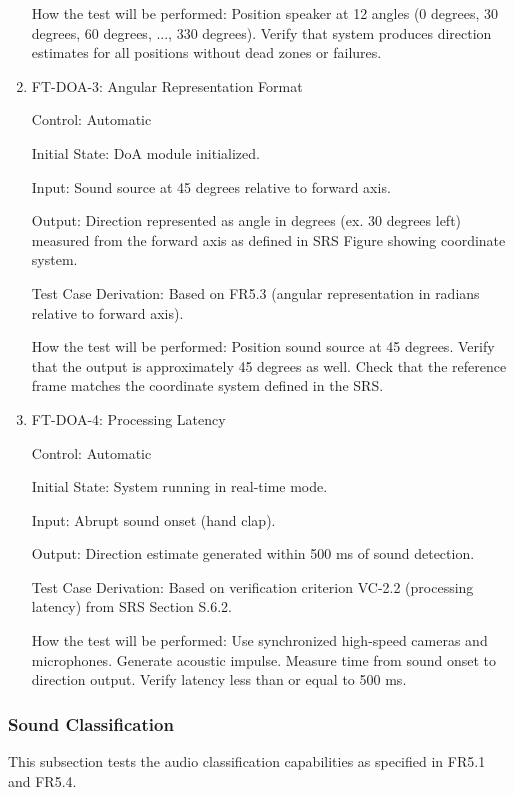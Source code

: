 \documentclass[12pt, titlepage]{article}
\begin{document}
\begin{enumerate}
How the test will be performed: Position speaker at 12 angles (0 degrees, 30 degrees, 60 degrees, ...,
330 degrees). Verify that system produces direction estimates for all positions without
dead zones or failures.

\item{FT-DOA-3: Angular Representation Format\\}

Control: Automatic
					
Initial State: DoA module initialized.
					
Input: Sound source at 45 degrees relative to forward axis.
					
Output: Direction represented as angle in degrees (ex. 30 degrees left) measured
 from the forward axis as defined in SRS Figure showing coordinate system.

Test Case Derivation: Based on FR5.3 (angular representation in radians relative
to forward axis).

How the test will be performed: Position sound source at 45 degrees. Verify that the output
is approximately 45 degrees as well. Check that the reference frame matches the
coordinate system defined in the SRS.

\item{FT-DOA-4: Processing Latency\\}

Control: Automatic
					
Initial State: System running in real-time mode.
					
Input: Abrupt sound onset (hand clap).
					
Output: Direction estimate generated within 500 ms of sound detection.

Test Case Derivation: Based on verification criterion VC-2.2 (processing
latency) from SRS Section S.6.2.

How the test will be performed: Use synchronized high-speed cameras and
microphones. Generate acoustic impulse. Measure time from sound onset to
direction output. Verify latency less than or equal to 500 ms.

\end{enumerate}

\subsubsection{Sound Classification}

This subsection tests the audio classification capabilities as specified in
FR5.1 and FR5.4.
\end{document}
